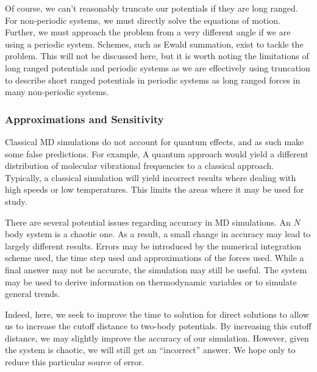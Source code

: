 %
Of course, we can't reasonably truncate our potentials if they are long ranged.
%
For non-periodic systems, we must directly solve the equations of motion.
%
Further, we must approach the problem from a very different angle if we
are using a periodic system.
%
Schemes, such as Ewald summation, exist to tackle the problem.
%
This will not be discussed here, but it is worth noting the limitations of
long ranged potentials and periodic systems as we are effectively using
truncation to describe short ranged potentials in periodic systems as
long ranged forces in many non-periodic systems.


\subsubsection{Approximations and Sensitivity}

Classical MD simulations do not account for quantum effects,
and as such make some false predictions.
%
For example, A quantum approach would yield
a different distribution of
molecular vibrational frequencies to a classical approach.
%
Typically, a classical simulation will yield incorrect results
where dealing with high speeds or low temperatures.
%
This limits the areas where it may be used for study.

There are several potential issues regarding accuracy in MD simulations.
%
An $N$ body system is a chaotic one.
%
As a result, a small change in accuracy may lead to
largely different results.
%
Errors may be introduced by
the numerical integration scheme used,
the time step used and
approximations of the forces used.
%
While a final answer may not be accurate,
the simulation may still be useful.
%
The system may be used to derive information on
thermodynamic variables or to simulate general trends.

Indeed, here, we seek to improve the time to solution for direct solutions
to allow us to increase the cutoff distance to two-body potentials.
%
By increasing this cutoff distance, we may slightly improve the accuracy
of our simulation.
%
However, given the system is chaotic, we will
still get an ``incorrect'' answer.
%
We hope only to reduce this particular source of error.
